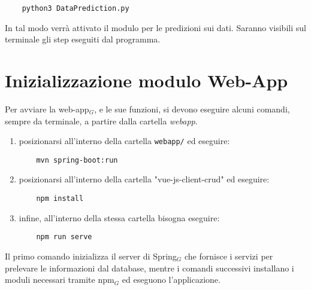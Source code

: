 \begin{lstlisting}
    python3 DataPrediction.py
\end{lstlisting}
In tal modo verrà attivato il modulo per le predizioni sui dati.
Saranno visibili sul terminale gli step eseguiti dal programma.


\section{Inizializzazione modulo Web-App}\label{ProceduraDiInstallazioneInizializzazioneModuloWebApp}
Per avviare la web-app$_G$, e le sue funzioni, si devono eseguire alcuni comandi, sempre da terminale, a partire dalla cartella \textit{webapp}.
\begin{enumerate}
  \item posizionarsi all'interno della cartella \texttt{webapp/} ed eseguire:
  \begin{lstlisting}
    mvn spring-boot:run
  \end{lstlisting}
  \item posizionarsi all'interno della cartella "vue-js-client-crud" ed eseguire:
  \begin{lstlisting}
    npm install
  \end{lstlisting}
  \item infine, all'interno della stessa cartella bisogna eseguire:
  \begin{lstlisting}
    npm run serve
  \end{lstlisting}
\end{enumerate}
Il primo comando inizializza il server di Spring$_G$ che fornisce i servizi per prelevare le informazioni dal database, mentre i comandi successivi installano i moduli necessari tramite npm$_G$ ed eseguono l'applicazione.

